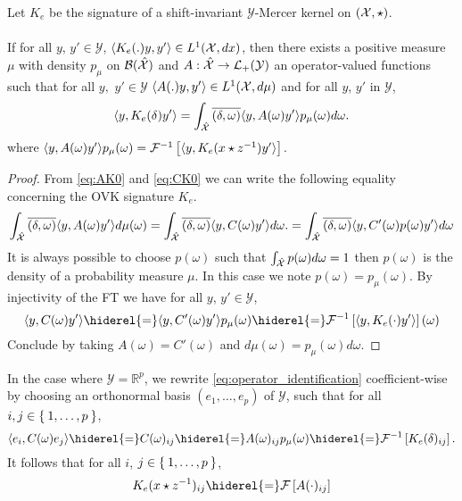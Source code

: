 \begin{proposition}
\label{pr:spectral}
Let $K_e$ be the signature of a shift-invariant $\mathcal{Y}$-Mercer kernel on $(\mathcal{X}, \star)$.
\paragraph{}
If for all $y$, $y' \in\mathcal{Y}$, $\langle K_e(.)y,y'\rangle\in L^1(\mathcal{X},dx)$, then there exists a positive measure $\mu$ with density $p_{\mu}$ on $\mathcal{B}(\mathcal{\hat{\mathcal{X}}})$ and $A:\hat{\mathcal{X}}\to \mathcal{L}_+(\mathcal{Y})$ an operator-valued functions such that for all $y,$ $y'\in\mathcal{Y}$ $\langle A(.)y,y'\rangle\in L^1(\mathcal{X},d\mu)$ and for all $y$, $y'$ in $\mathcal{Y}$,
\begin{dmath*}
\inner{y, K_e(\delta)y'}=\int_{\dual{\mathcal{X}}}\conj{\pairing{\delta, \omega}}\inner{y, A(\omega)y'}p_{\mu}(\omega)d\omega.
\end{dmath*}
where $\langle y, A(\omega)y'\rangle p_{\mu}(\omega) = \mathcal{F}^{-1}\left[\langle y, K_e(x\star {z}^{-1})y'\rangle\right]$.
\end{proposition}
\begin{proof}
From \cref{eq:AK0} and \cref{eq:CK0} we can write the following equality concerning the \acs{OVK} signature $K_e$. 
\begin{dmath*}
\int_{\dual{\mathcal{X}}}\conj{\pairing{\delta, \omega}}\inner{y, A(\omega)y'}d\mu(\omega)=\int_{\dual{\mathcal{X}}}\conj{\pairing{\delta, \omega}}\inner{y, C(\omega)y'}d\omega.
=\int_{\dual{\mathcal{X}}}\conj{\pairing{\delta, \omega}}\inner{y, C'(\omega)p(\omega)y'}d\omega
\end{dmath*}
It is always possible to choose $p(\omega)$ such that $\int_{\hat{\mathcal{X}}}p(\omega)d\omega=1$ then $p(\omega)$ is the density of a probability measure $\mu$. In this case we note $p(\omega)=p_{\mu}(\omega)$. By injectivity of the \acl{FT} we have for all $y$, $y'\in\mathcal{Y}$,
\begin{dmath}
\label{eq:operator_identification}
\inner{y, C(\omega)y'}\hiderel{=}\inner{y, C'(\omega)y'}p_{\mu}(\omega)\hiderel{=}\IFT{\inner{y, K_e(\cdot)y'}}(\omega)
\end{dmath}
Conclude by taking $A(\omega)=C'(\omega)$ and $d\mu(\omega)=p_\mu(\omega)d\omega$.
\end{proof}
In the case where $\mathcal{Y}=\mathbb{R}^p$, we rewrite \cref{eq:operator_identification} coefficient-wise by choosing an orthonormal basis $(e_1,\ldots, e_p)$ of $\mathcal{Y}$, such that for all $ i,j\in \Set{1, \ldots, p}$,
\begin{dmath}
\label{eq:operator_identification_real}\inner{e_i,C(\omega)e_j}\hiderel{=}C(\omega)_{ij}\hiderel{=}A(\omega)_{ij}p_{\mu}(\omega)\hiderel{=}\IFT{K_e(\delta)_{ij}}.
\end{dmath}
It follows that for all $i$, $j \in \Set{1, \ldots, p}$,
\begin{dmath}\label{eq:matrix-exp}
K_e(x\groupop \inv{z})_{ij} \hiderel{=} \FT{A(\cdot)_{ij}}
\end{dmath}


